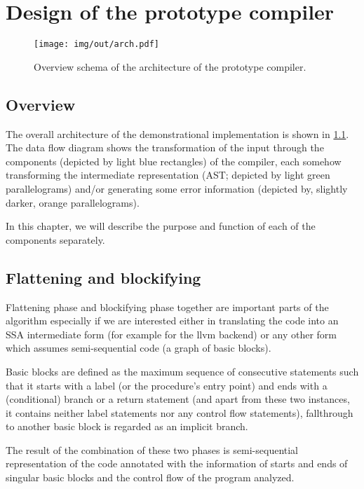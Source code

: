 

\chapter{Design of the prototype compiler}
\label{chap3}

\begin{figure}
\texttt{[image: img/out/arch.pdf]}
\caption{Overview schema of the architecture of the prototype compiler.}
\label{fig:arch}
\end{figure}

\section{Overview}

The overall architecture of the demonstrational implementation is shown in \cref{fig:arch}. The data flow diagram shows the transformation of the input through the components (depicted by light blue rectangles) of the compiler, each somehow transforming the intermediate representation (AST; depicted by light green parallelograms) and/or generating some error information (depicted by, slightly darker, orange parallelograms).

In this chapter, we will describe the purpose and function of each of the components separately.

\section{Flattening and blockifying}

Flattening phase and blockifying phase together are important parts of the algorithm especially if we are interested either in translating the code into an SSA intermediate form (for example for the llvm backend) or any other form which assumes semi-sequential code (a graph of basic blocks).

Basic blocks are defined as the maximum sequence of consecutive statements such that it starts with a label (or the procedure's entry point) and ends with a (conditional) branch or a return statement (and apart from these two instances, it contains neither label statements nor any control flow statements), fallthrough to another basic block is regarded as an implicit branch.

The result of the combination of these two phases is semi-sequential representation of the code annotated with the information of starts and ends of singular basic blocks and the control flow of the program analyzed.

